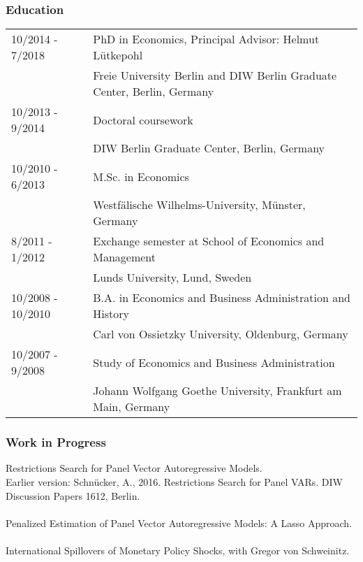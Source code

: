 \documentclass[10pt,a4paper]{article}
\begin{document}
\subsubsection*{Education}
\begin{tabular}{ p{3cm} | p{13cm}}
10/2014 - 7/2018 &PhD in Economics, Principal Advisor: Helmut L\"utkepohl \\
 & Freie University Berlin and DIW Berlin Graduate Center, Berlin, Germany \\ [0.1cm] 
 10/2013 - 9/2014  & Doctoral coursework\\ 
  & DIW Berlin Graduate Center, Berlin, Germany  \\ [0.1cm]
10/2010 - 6/2013 & M.Sc. in Economics \\
 & Westf\"alische Wilhelms-University, M\"unster, Germany \\ [0.1cm]
8/2011 - 1/2012 & Exchange semester at School of Economics and Management \\
&  Lunds University, Lund, Sweden  \\ [0.1cm]
10/2008 - 10/2010 & B.A. in Economics and Business Administration and History \\
 & Carl von Ossietzky University, Oldenburg, Germany \\ [0.1cm]
 10/2007 - 9/2008 & Study of Economics and Business Administration \\ 
 & Johann Wolfgang Goethe University, Frankfurt am Main, Germany 
\end{tabular}
\vspace{0.2cm}
\subsubsection*{Work in Progress}
Restrictions Search for Panel Vector Autoregressive Models.\\Earlier version: Schn\"ucker, A., 2016. Restrictions Search for Panel VARs. DIW Discussion Papers 1612, Berlin.\\\\
Penalized Estimation of Panel Vector Autoregressive Models: A Lasso Approach. \\\\
International Spillovers of Monetary Policy Shocks, with Gregor von Schweinitz.
\vspace{0.2cm}
\end{document}
